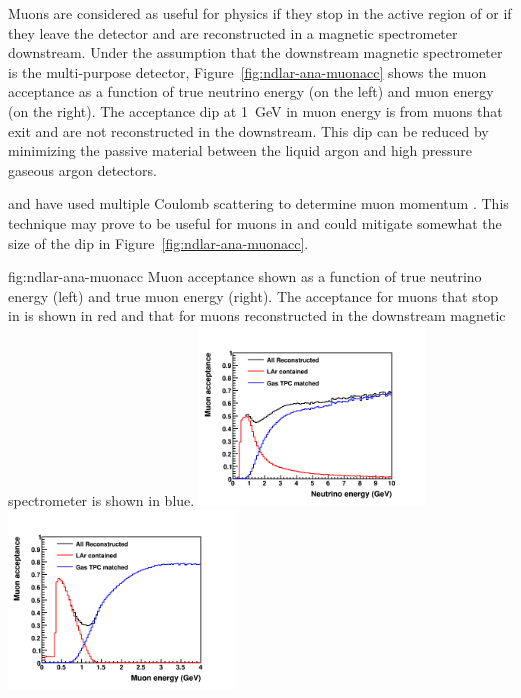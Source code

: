 %

Muons are considered as useful for physics if they stop in the active region of  or if they leave the  detector and are reconstructed in a magnetic spectrometer downstream.  
Under the assumption that the downstream magnetic spectrometer is the multi-purpose detector, Figure~\ref{fig:ndlar-ana-muonacc}  shows the muon acceptance as a function of true neutrino energy (on the left) and muon energy (on the right). 
The acceptance dip at \SI{1}{\giga\electronvolt} in muon energy is from muons that exit  and are not reconstructed in the  downstream. This dip can be reduced by minimizing the passive material between the liquid argon and high pressure gaseous argon detectors.

 and  have used multiple Coulomb scattering to determine muon momentum \cite{Abratenko:2017nki}.  
This technique may prove to be useful for muons in  and could  mitigate somewhat the size of the dip in Figure~\ref{fig:ndlar-ana-muonacc}.   

\begin{dunefigure}{fig:ndlar-ana-muonacc}
{Muon acceptance shown as a function of true neutrino energy (left) and true muon energy (right).  The acceptance for muons that stop in  is shown in red and that for muons reconstructed in the downstream magnetic spectrometer is shown in blue.}
      \includegraphics[width=0.45\textwidth]{graphics/lartpc/muReco_Ev.png}
      \includegraphics[width=0.45\textwidth]{graphics/lartpc/muReco_Emu.png}
\end{dunefigure}

